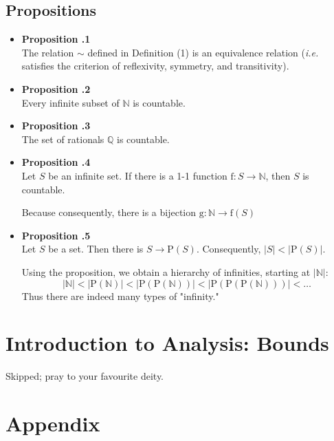 \documentclass[a4paper,12pt]{article}
\newcommand{\prop}[1]{
    \item \textbf{Proposition \thesection.#1}\\
}
\let\emph\relax %
\begin{document}
\subsection{Propositions}
\begin{itemize}
    \prop 1
    The relation $\sim$ defined in Definition (1) is an equivalence relation (\textit{i.e.}
    satisfies the criterion of reflexivity, symmetry, and transitivity).
    
    \prop 2
    Every infinite subset of $\mathbb{N}$ is countable.
    
    \prop 3
    The set of rationals $\mathbb{Q}$ is countable.
    
    \prop 4
    Let $S$ be an infinite set. If there is a 1-1 function $\text{f}: S \to \mathbb{N}$,
    then $S$ is countable.
    
    Because consequently, there is a bijection $\text{g}: \mathbb{N} \to \text{f}(S)$
    
    \prop 5
    Let $S$ be a set. Then there is \emph{no bijection} $S \to \text{P}(S)$. Consequently,
    $|S| < |\text{P}(S)|$.
    
    Using the proposition, we obtain a hierarchy of infinities, starting at $|\mathbb{N}|$:
        $$ |\mathbb{N}| < |\text{P}(\mathbb{N})| < |\text{P}(\text{P}(\mathbb{N}))| < |\text{P}(\text{P}(\text{P}(\mathbb{N})))| < \ldots $$
    Thus there are indeed many types of "infinity."
\end{itemize}

\section{Introduction to Analysis: Bounds}
Skipped; pray to your favourite deity.

\appendix
\section{Appendix}
\end{document}
